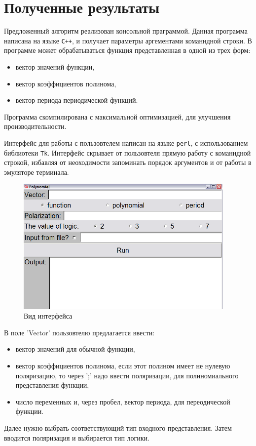 \documentclass[a4paper, 14pt]{extarticle}
\begin{document}
\section{Полученные результаты}
Предложенный алгоритм реализован консольной праграммой. Данная программа написана на языке \verb!C++!, и получает параметры
аргементами команндной строки. В программе может обрабатываться функция представленная в одной из трех форм:
\begin{itemize}
\item вектор значений функции,
\item вектор коэффициентов полинома,
\item вектор периода периодической функций.
\end{itemize}
Программа скомпилирована с максимальной оптимизацией, для улучшения производительности.

Интерфейс для работы с пользовтелем написан на языке \verb!perl!, с использованием библиотеки \verb!Tk!.
Интерфейс скрывает от пользовтеля прямую работу с команндной строкой, избавляя от неоходимости запоминать порядок аргументов и от
работы в эмуляторе терминала.
\begin{figure}[t]
\centering
\includegraphics[width=0.95\textwidth]{xp.png}
\caption{Вид интерфейса \label{xp}}
\end{figure}

\newpage

В поле 'Vector' пользовтелю предлагается ввести:
\begin{itemize}
\item вектор значений для обычной функции,
\item вектор коэффициентов полинома, если этот полином имеет не нулевую поляризацию, то через ';' надо ввести поляризации,
для полиномиального представления функции,
\item число переменных и, через пробел, вектор периода, для переодической функции.
\end{itemize}
Далее нужно выбрать соответствующий тип входного представления.
Затем вводится поляризация и выбирается тип логики.
\end{document}
